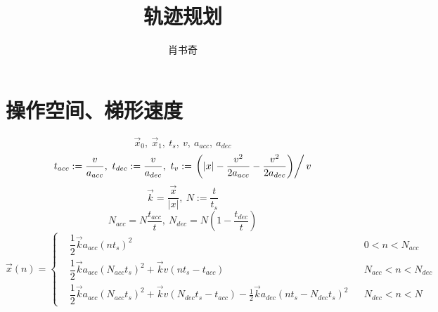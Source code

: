 \documentclass{tufte-handout}
\title{轨迹规划}
\author{肖书奇}
\begin{document}
\maketitle
\section{操作空间、梯形速度}
\[
    \vec x_0,\ \vec x_1,\ t_s,\ v,\ a_{acc},\ a_{dec}
\]
\[
    t_{acc} := \frac{v}{a_{acc}},\ t_{dec} := \frac{v}{a_{dec}},\ t_v := \left.\left(\vert x\vert-\frac{v^2}{2a_{acc}}-\frac{v^2}{2a_{dec}}\right)\right/v
\]
\[
    \vec k = \frac{\vec x}{\vert x\vert},\ N:=\frac{t}{t_s}
\]
\[
    N_{acc} = N\frac{t_{acc}}{t},\ N_{dec} = N(1-\frac{t_{dec}}{t})
\]
\[
    \vec x(n) = \left\{\begin{aligned}
         & \dfrac{1}{2}\vec k a_{acc}(nt_s)^2                                                                                     &  & 0<n<N_{acc}       \\
         & \dfrac{1}{2}\vec k a_{acc}(N_{acc}t_s)^2 + \vec k v(nt_s-t_{acc})                                                      &  & N_{acc}<n<N_{dec} \\
         & \dfrac{1}{2}\vec k a_{acc}(N_{acc}t_s)^2 + \vec k v(N_{dec}t_s-t_{acc}) - \frac{1}{2}\vec k a_{dec}(nt_s-N_{dec}t_s)^2 &  & N_{dec}<n<N
    \end{aligned}\right.
\]
\end{document}
